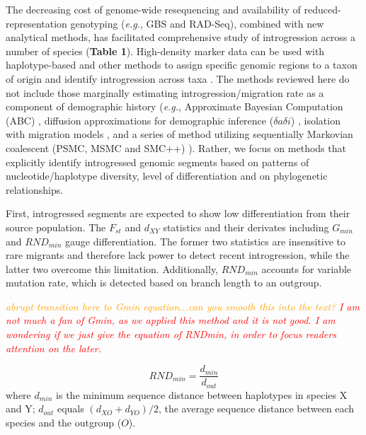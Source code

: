 \documentclass[11pt]{article}
\newcommand{\mbh}[1]{\textcolor{orange}{ \emph{\scriptsize  #1}} } %
\newcommand{\lwang}[1]{\textcolor{red}{ \emph{\scriptsize  #1}} } %
\begin{document}
The decreasing cost of genome-wide resequencing and availability of reduced-representation genotyping (\emph{e.g.}, GBS and RAD-Seq), combined with new analytical methods, has facilitated comprehensive study of introgression across a number of species (\textbf{Table 1}).
High-density marker data can be used with haplotype-based and other methods to assign specific genomic regions to a taxon of origin and identify introgression across taxa \cite{Martin2015,Price2009,Lawson2012,pease2015,rosenzweig2016,geneva2015}.
The methods reviewed here do not include those marginally estimating introgression\slash migration rate as a component of demographic history (\emph{e.g.}, Approximate Bayesian Computation (ABC) \cite{beaumont2002}, diffusion approximations for demographic inference ($\delta a\delta i$) \cite{gutenkunst2009}, isolation with migration models \cite{hey2004}, and a series of method utilizing sequentially Markovian coalescent (PSMC, MSMC and SMC++) \cite{li2011, schiffels2014, terhorst2017}). 
Rather, we focus on methods that explicitly identify introgressed genomic segments based on patterns of nucleotide/haplotype diversity, level of differentiation and on phylogenetic relationships.

First, introgressed segments are expected to show low differentiation from their source population.
The $F_{st}$ and $d_{XY}$ statistics and their derivates including $G_{min}$ \cite{geneva2015} and $RND_{min}$\cite{rosenzweig2016} gauge differentiation. 
The former two statistics are insensitive to rare migrants and therefore lack power to detect recent introgression, while the latter two overcome this limitation.
Additionally, $RND_{min}$ accounts for variable mutation rate, which is detected based on branch length to an outgroup. 

\mbh{abrupt transition here to Gmin equation...can you smooth this into the text?}
\lwang{I am not much a fan of Gmin, as we applied this method and it is not good. I am wondering if we just give the equation of RNDmin, in order to focus readers attention on the later.}
 
 \begin{equation}
 	RND_{min} = \frac{d_{min}}{d_{out}}
 \end{equation}
where $d_{min}$ is the minimum sequence distance between haplotypes in species X and Y; $d_{out}$ equals $(d_{XO} + d_{YO})/2$, the average sequence distance between each species and the outgroup ($O$).
 
\end{document}
